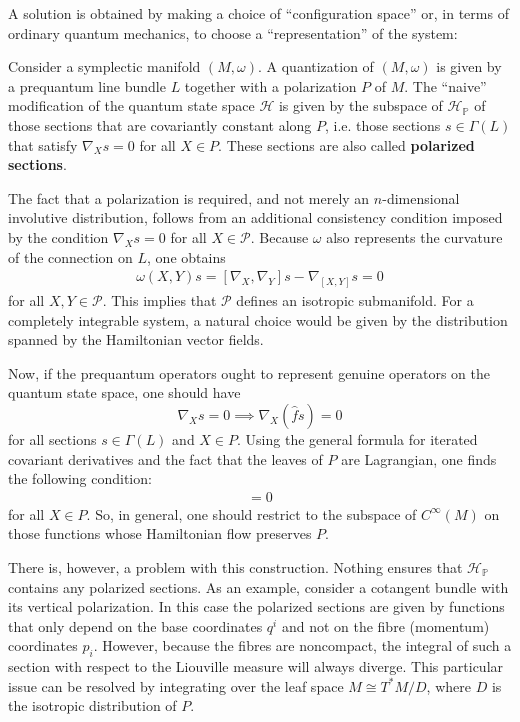     A solution is obtained by making a choice of ``configuration space'' or, in terms of ordinary quantum mechanics, to choose a ``representation'' of the system:
    \begin{construct}[Quantization]
        Consider a symplectic manifold $(M,\omega)$. A quantization of $(M,\omega)$ is given by a prequantum line bundle $L$ together with a polarization $P$ of $M$. The ``naive'' modification of the quantum state space $\mathcal{H}$ is given by the subspace of $\mathcal{H}_\mathbb{P}$ of those sections that are covariantly constant along $P$, i.e. those sections $s\in\Gamma(L)$ that satisfy $\nabla_Xs=0$ for all $X\in P$. These sections are also called \textbf{polarized sections}.

        The fact that a polarization is required, and not merely an $n$-dimensional involutive distribution, follows from an additional consistency condition imposed by the condition $\nabla_Xs=0$ for all $X\in\mathcal{P}$. Because $\omega$ also represents the curvature of the connection on $L$, one obtains
        \begin{gather}
            \omega(X,Y)s = [\nabla_X,\nabla_Y]s - \nabla_{[X,Y]}s = 0
        \end{gather}
        for all $X,Y\in\mathcal{P}$. This implies that $\mathcal{P}$ defines an isotropic submanifold. For a completely integrable system, a natural choice would be given by the distribution spanned by the Hamiltonian vector fields.

        Now, if the prequantum operators ought to represent genuine operators on the quantum state space, one should have \[\nabla_Xs=0\implies\nabla_X(\hat{f}s)=0\] for all sections $s\in\Gamma(L)$ and $X\in P$. Using the general formula for iterated covariant derivatives and the fact that the leaves of $P$ are Lagrangian, one finds the following condition:
        \begin{gather}
            [X,X_f]=0
        \end{gather}
        for all $X\in P$. So, in general, one should restrict to the subspace of $C^\infty(M)$ on those functions whose Hamiltonian flow preserves $P$.

        There is, however, a problem with this construction. Nothing ensures that $\mathcal{H}_\mathbb{P}$ contains any polarized sections. As an example, consider a cotangent bundle with its vertical polarization. In this case the polarized sections are given by functions that only depend on the base coordinates $q^i$ and not on the fibre (momentum) coordinates $p_i$. However, because the fibres are noncompact, the integral of such a section with respect to the Liouville measure will always diverge. This particular issue can be resolved by integrating over the leaf space $M\cong T^*M/D$, where $D$ is the isotropic distribution of $P$.
    \end{construct}

